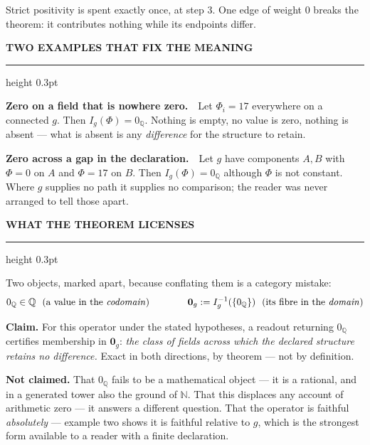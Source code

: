 \documentclass[10pt]{article}
\newcommand{\zQ}{0_{\mathbb{Q}}}
\newcommand{\zg}{\mathbf{0}_{g}}
\newcommand{\hd}[1]{\par\vspace{0.10em}\noindent
  {\color{acc}\scriptsize\bfseries\MakeUppercase{#1}}\hspace{0.55em}%
  {\color{acc}\leaders\hrule height 0.3pt\hfill\kern0pt}\par\vspace{0.02em}}
\begin{document}
{\color{mut}Strict positivity is spent exactly once, at step 3. One edge of weight $0$ breaks the theorem: it contributes nothing while its endpoints differ.}

\hd{two examples that fix the meaning}

\begin{tcolorbox}[colback=white,colframe=mut,boxrule=0.4pt,arc=1pt,left=8pt,right=8pt,top=3.5pt,bottom=3.5pt]
\textbf{Zero on a field that is nowhere zero.}\ \ Let $\Phi_i=17$ everywhere on a connected $g$. Then $I_g(\Phi)=\zQ$. Nothing is empty, no value is zero, nothing is absent --- what is absent is any \emph{difference} for the structure to retain.

\vspace{0.35em}
\textbf{Zero across a gap in the declaration.}\ \ Let $g$ have components $A,B$ with $\Phi=0$ on $A$ and $\Phi=17$ on $B$. Then $I_g(\Phi)=\zQ$ although $\Phi$ is not constant. Where $g$ supplies no path it supplies no comparison; the reader was never arranged to tell those apart.
\end{tcolorbox}

\hd{what the theorem licenses}

Two objects, marked apart, because conflating them is a category mistake:
\vspace{-0.6em}\[
\zQ \in \mathbb{Q}\ \ \text{(a value in the \emph{codomain})}
\qquad\qquad
\zg := I_g^{-1}(\{\zQ\})\ \ \text{(its fibre in the \emph{domain})}
\]\vspace{-0.55em}

\begin{tcolorbox}[colback=white,colframe=acc,boxrule=0.9pt,arc=1pt,left=9pt,right=9pt,top=4pt,bottom=4pt]
\textbf{Claim.} For this operator under the stated hypotheses, a readout returning $\zQ$ certifies membership in $\zg$: \emph{the class of fields across which the declared structure retains no difference.} Exact in both directions, by theorem --- not by definition.
\end{tcolorbox}

\vspace{0.2em}
\textbf{Not claimed.} That $\zQ$ fails to be a mathematical object --- it is a rational, and in a generated tower also the ground of $\mathbb{N}$. That this displaces any account of arithmetic zero --- it answers a different question. That the operator is faithful \emph{absolutely} --- example two shows it is faithful relative to $g$, which is the strongest form available to a reader with a finite declaration.
\end{document}
